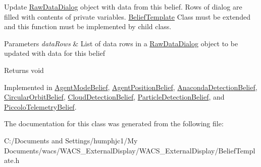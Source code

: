 Update \hyperlink{class_raw_data_dialog}{RawDataDialog} object with data from this belief. Rows of dialog are filled with contents of private variables. \hyperlink{class_belief_template}{BeliefTemplate} Class must be extended and this function must be implemented by child class. 


\begin{DoxyParams}{Parameters}
{\em dataRows} & List of data rows in a \hyperlink{class_raw_data_dialog}{RawDataDialog} object to be updated with data for this belief \\
\hline
\end{DoxyParams}
\begin{DoxyReturn}{Returns}
void 
\end{DoxyReturn}


Implemented in \hyperlink{class_agent_mode_belief_a96d89f34b7d27bb5e90b4c5e78cc0c38}{AgentModeBelief}, \hyperlink{class_agent_position_belief_a881a657a0261fbbb2086365a522e7b8d}{AgentPositionBelief}, \hyperlink{class_anaconda_detection_belief_a5e9699b6543d9cc1cd4fbfbecb6ea8f9}{AnacondaDetectionBelief}, \hyperlink{class_circular_orbit_belief_a06a40bc8e475f6f443edcfb56713860d}{CircularOrbitBelief}, \hyperlink{class_cloud_detection_belief_aca53d51cdf1df9ff57bc0565967c78d4}{CloudDetectionBelief}, \hyperlink{class_particle_detection_belief_a16879c7ebd0a461297bc6064e0562b7a}{ParticleDetectionBelief}, and \hyperlink{class_piccolo_telemetry_belief_a64a65f46bda72414e6d1760e4117d519}{PiccoloTelemetryBelief}.



The documentation for this class was generated from the following file:\begin{DoxyCompactItemize}
\item 
C:/Documents and Settings/humphjc1/My Documents/wacs/WACS\_\-ExternalDisplay/WACS\_\-ExternalDisplay/BeliefTemplate.h\end{DoxyCompactItemize}
